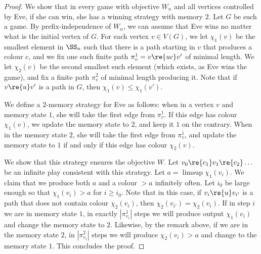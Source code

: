 \counterexampleLift*

\begin{proof}
    We show that in every game with objective $W_n$ and all vertices controlled by Eve, if she can win, she has a winning strategy with memory $2$.
    Let $G$ be such a game.
    By prefix-independence of $W_n$, we can assume that Eve wins no matter what is the initial vertex of $G$.
    For each vertex $v\in V(G)$, we let $\chi_1(v)$ be the smallest element in $\SS_n$ such that there is a path starting in $v$ that produces a colour $c$, and we fix one such finite path $\pi_v^1 = v \re{ uc} v'$ of minimal length.
    We let $\chi_2(v)$ be the second smallest such element (which exists, as Eve wins the game), and fix a finite path $\pi_v^2$ of minimal length producing it.
    Note that if $v\re{u} v'$ is a path in $G$, then $\chi_1(v) \leq \chi_1(v')$.

    We define a $2$-memory strategy for Eve as follows: when in a vertex $v$ and memory state $1$, she will take the first edge from $\pi_v^1$.
    If this edge has colour $\chi_1(v)$, we update the memory state to $2$, and keep it $1$ on the contrary.
    When in the memory state $2$, she will take the first edge from $\pi_v^1$, and update the memory state to $1$ if and only if this edge has colour $\chi_2(v)$.

    We show that this strategy ensures the objective $W$. Let $v_0\re{c_1} v_1\re{c_2}\dots$ be an infinite play consistent with this strategy.
    Let $a = \limsup \chi_1(v_i)$.
    We claim that we produce both $a$ and a colour $>a$ infinitely often.
    Let $i_0$ be large enough so that $\chi_1(v_i) > a$ for $i\geq i_0$. Note that in this case, if $v_i\re{u} v_{i'}$ is a path that does not contain colour $\chi_2(v_i)$, then  $\chi_2(v_{i'}) =  \chi_2(v_i)$.
    If in step $i$ we are in memory state $1$, 
    in exactly $|\pi_{v_{i}}^1|$ steps we will produce output $\chi_1(v_{i})$ and change the memory state to $2$.
    Likewise, by the remark above, if we are in the memory state $2$, in $|\pi_{v_{i}}^2|$ steps we will produce $\chi_2(v_i) > a$ and change to the memory state $1$.
    This concludes the proof.
\end{proof}